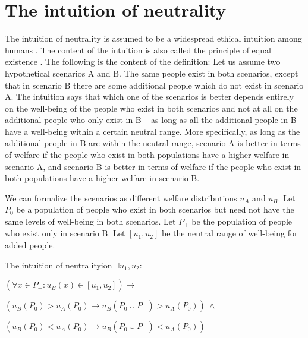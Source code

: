 \section{The intuition of neutrality}

The intuition of neutrality is assumed to be a widespread ethical intuition among humans \cite[p.~176f]{broome_2012}. The content of the intuition is also called the principle of equal existence \cite[p.~146]{broome_2004}. The following is the content of the definition: Let us assume two hypothetical scenarios A and B. The same people exist in both scenarios, except that in scenario B there are some additional people which do not exist in scenario A. The intuition says that which one of the scenarios is better depends entirely on the well-being of the people who exist in both scenarios and not at all on the additional people who only exist in B – as long as all the additional people in B have a well-being within a certain neutral range. More specifically, as long as the additional people in B are within the neutral range, scenario A is better in terms of welfare if the people who exist in both populations have a higher welfare in scenario A, and scenario B is better in terms of welfare if the people who exist in both populations have a higher welfare in scenario B.  

We can formalize the scenarios as different welfare distributions $u_A$ and $u_B$. Let $P_0$ be a population of people who exist in both scenarios but need not have the same levels of well-being in both scenarios. Let $P_+$ be the population of people who exist only in scenario B. Let $[u_1, u_2]$ be the neutral range of well-being for added people.  

\begin{Definition}{The intuition of neutrality}{ion} 
$
  \exists u_1, u_2: 
$

\hspace{.5cm} $
  (\forall x \in P_+ : u_B(x) \in [u_1, u_2] )
  \rightarrow 
$

\hspace{1cm} $
  ( u_B(P_0) > u_A(P_0) 
  \rightarrow 
  u_B(P_0 \cup P_+) > u_A(P_0) ) 
  \ \wedge
$  

\hspace{1cm} $
  ( u_B(P_0) < u_A(P_0) 
  \rightarrow 
  u_B(P_0 \cup P_+) < u_A(P_0) ) 
$
\end{Definition}

